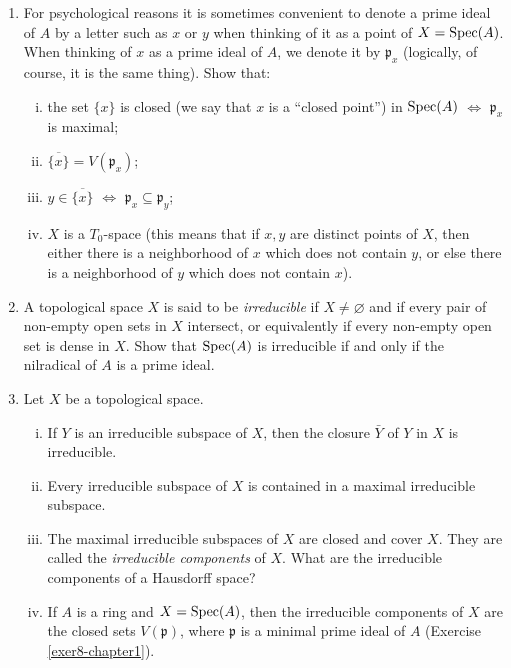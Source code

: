 \begin{enumerate}
    \item \label{exer18-chapter1}For psychological reasons it is sometimes convenient to denote a prime ideal of $A$ by a letter such as $x$ or $y$ when thinking of it as a point of $X = \operatorname{Spec}(A)$. When thinking of $x$ as a prime ideal of $A$, we denote it by $\mathfrak{p}_x$ (logically, of course, it is the same thing). Show that:
    \begin{enumerate}[i)]
        \item the set $\{x\}$ is closed (we say that $x$ is a ``closed point'') in $\operatorname{Spec}(A)$ $\iff$ $\mathfrak{p}_x$ is maximal;
        \item $\overline{\{x\}} = V(\mathfrak{p}_x)$;
        \item $y \in \overline{\{x\}}$ $\iff$ $\mathfrak{p}_x \subseteq \mathfrak{p}_y$;
        \item $X$ is a $T_0$-space (this means that if $x, y$ are distinct points of $X$, then either there is a neighborhood of $x$ which does not contain $y$, or else there is a neighborhood of $y$ which does not contain $x$).
    \end{enumerate}

    \item \label{exer19-chapter1}A topological space $X$ is said to be \emph{irreducible} if $X \neq \varnothing$ and if every pair of non-empty open sets in $X$ intersect, or equivalently if every non-empty open set is dense in $X$. Show that $\operatorname{Spec}(A)$ is irreducible if and only if the nilradical of $A$ is a prime ideal.

    \item \label{exer20-chapter1}Let $X$ be a topological space.
    \begin{enumerate}[i)]
        \item If $Y$ is an irreducible subspace of $X$, then the closure $\bar{Y}$ of $Y$ in $X$ is irreducible.
        \item Every irreducible subspace of $X$ is contained in a maximal irreducible subspace.
        \item The maximal irreducible subspaces of $X$ are closed and cover $X$. They are called the \emph{irreducible components} of $X$. What are the irreducible components of a Hausdorff space?
        \item If $A$ is a ring and $X = \operatorname{Spec}(A)$, then the irreducible components of $X$ are the closed sets $V(\mathfrak{p})$, where $\mathfrak{p}$ is a minimal prime ideal of $A$ (Exercise \ref{exer8-chapter1}).
    \end{enumerate}


\end{enumerate}
